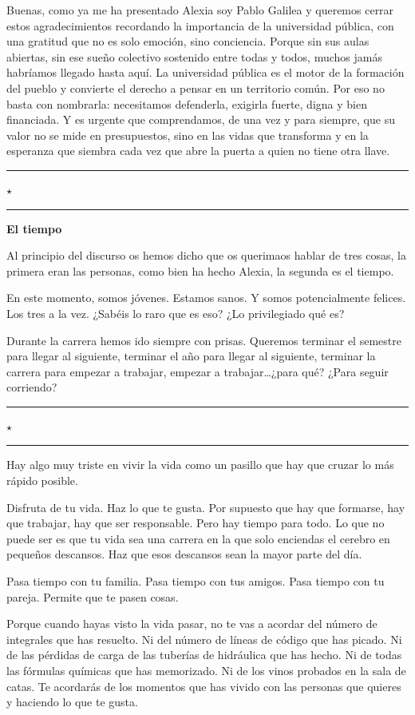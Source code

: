 \documentclass[20pt, a4paper]{extarticle}
\newcommand{\separador}{%
  \begin{center}
    \textcolor{dorado}{\rule{2cm}{0.4pt}\quad\(\star\)\quad\rule{2cm}{0.4pt}}
  \end{center}
  \vspace{0.3em}
}
\begin{document}
\thispagestyle{fancy}


Buenas, como ya me ha presentado Alexia soy Pablo Galilea y queremos cerrar estos agradecimientos recordando la importancia de la universidad pública, con una gratitud que no es solo emoción, sino conciencia. Porque sin sus aulas abiertas, sin ese sueño colectivo sostenido entre todas y todos, muchos jamás habríamos llegado hasta aquí. La universidad pública es el motor de la formación del pueblo y convierte el derecho a pensar en un territorio común. Por eso no basta con nombrarla: necesitamos defenderla, exigirla fuerte, digna y bien financiada. Y es urgente que comprendamos, de una vez y para siempre, que su valor no se mide en presupuestos, sino en las vidas que transforma y en la esperanza que siembra cada vez que abre la puerta a quien no tiene otra llave.

\separador

\textbf{\large\color{azulUR} El tiempo}

\medskip

Al principio del discurso os hemos dicho que os querimaos hablar de tres cosas, la primera eran las personas, como bien ha hecho Alexia, la segunda es el tiempo.

En este momento, somos jóvenes. Estamos sanos. Y somos potencialmente felices. Los tres a la vez.
¿Sabéis lo raro que es eso? ¿Lo privilegiado qué es?

Durante la carrera hemos ido siempre con prisas.
Queremos terminar el semestre para llegar al siguiente, terminar el año para llegar al siguiente, terminar la carrera para empezar a trabajar, empezar a trabajar\ldots ¿para qué? ¿Para seguir corriendo?
\separador




Hay algo muy triste en vivir la vida como un pasillo que hay que cruzar lo más rápido posible.


Disfruta de tu vida. Haz lo que te gusta. Por supuesto que hay que formarse, hay que trabajar, hay que ser responsable. Pero hay tiempo para todo. Lo que no puede ser es que tu vida sea una carrera en la que solo enciendas el cerebro en pequeños descansos. Haz que esos descansos sean la mayor parte del día.

Pasa tiempo con tu familia. Pasa tiempo con tus amigos. Pasa tiempo con tu pareja. Permite que te pasen cosas.

Porque cuando hayas visto la vida pasar, no te vas a acordar del número de integrales que has resuelto.
Ni del número de líneas de código que has picado. Ni de las pérdidas de carga de las tuberías de hidráulica que has hecho. Ni de todas las fórmulas químicas que has memorizado. Ni de los vinos probados en la sala de catas.
Te acordarás de los momentos que has vivido con las personas que quieres y haciendo lo que te gusta. 
\end{document}
